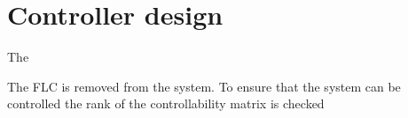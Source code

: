 \section{Controller design} \label{sec:ctrl-design}
The 


The FLC is removed from the system. To ensure that the system can be controlled the rank of the controllability matrix is checked